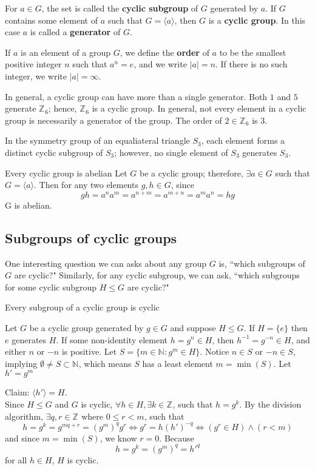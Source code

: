 \documentclass[11pt]{article} %
\newcommand\br{\vspace{15 pt}}
\newcommand\Z[1]{\text{$\mathbb{Z}^{#1}$}}
\newcommand\N[1]{\text{$\mathbb{N}^{#1}$}}
\newcommand\cyc[1]{\text{$\langle {#1} \rangle$}}
\newcommand\set[1]{\{#1\}}
\begin{document}
{
For $a \in G$, the set \cyc a is called the \textbf{cyclic subgroup} of $G$ generated by $a$. If $G$ contains some element of $a$ such that $G = \cyc a$, then $G$ is a \textbf{cyclic group}. In this case $a$ is called a \textbf{generator} of $G$.
}

\br

{
If $a$ is an element of a group $G$, we define the \textbf{order} of $a$ to be the smallest positive integer $n$ such that $a^n = e$, and we write $|a| = n$. If there is no such integer, we write $|a| = \infty$.
}

\br 
In general, a cyclic group can have more than a single generator. Both $1$ and $5$ generate $\Z{}_6$; hence, $\Z{}_6$ is a cyclic group. In general, not every element in a cyclic group is necessarily a generator of the group. The order of $2 \in \Z{}_6$ is 3.

In the symmetry group of an equaliateral triangle $S_3$, each element forms a distinct cyclic subgroup of $S_3$; however, no single element of $S_3$ generates $S_3$.

\br 
\theorem{}
{Every cyclic group is abelian}
{
Let $G$ be a cyclic group; therefore, $\exists a \in G$ such that $G = \cyc a$. Then for any two elements $g, h \in G$, since
$$
gh = a^n a^m = a^{n+m} = a^{m+n} = a^m a^n = hg
$$
G is abelian.
}

\br

\subsection{Subgroups of cyclic groups}
One interesting question we can asks about any group $G$ is, ``which subgroups of $G$ are cyclic?" Similarly, for any cyclic subgroup, we can ask, ``which subgroups for some cyclic subgroup $H \leqslant G$ are cyclic?"

\theorem{}
{Every subgroup of a cyclic group is cyclic}
{
Let $G$ be a cyclic group generated by $g \in G$ and suppose $H \leqslant G$. If $H = \set e$ then $e$ generates $H$. If some non-identity element $h = g^n \in H$, then $h^{-1} = g^{-n} \in H$, and either $n$ or $-n$ is positive.  Let $S = \set{ m \in \N{} : g^m \in H}$. Notice $n \in S$ or $-n \in S$, implying $\emptyset \ne S \subset \N{}$, which means $S$ has a least element $m = \min (S)$. Let $h' = g^m$

Claim: $\cyc {h'} = H$.\\
Since $H \leqslant G$ and $G$ is cyclic, $\forall h \in H, \exists k \in \Z{}$, such that $h = g^k$. By the division algorithm, $\exists q, r \in \Z{}$ where $0 \le r < m$, such that
$$
h = g^k = g^{mq+r} = (g^m)^q g^r \iff g^r = h (h')^{-q} \iff (g^r \in H) \wedge (r < m)
$$
and since $m = \min (S)$, we know $r = 0$. Because
$$
h = g^k = (g^m)^q = h'^q
$$
for all $h \in H$, $H$ is cyclic.
}
\end{document}
